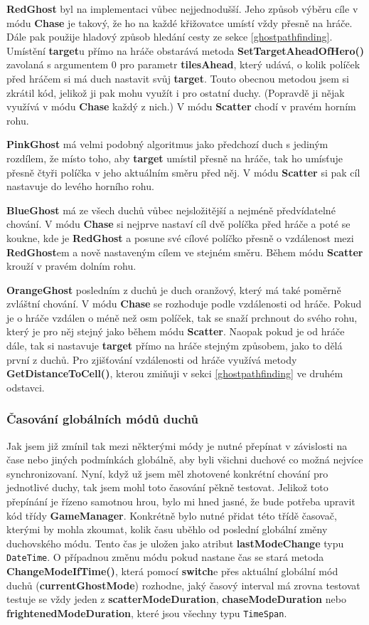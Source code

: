 \documentclass[a4]{article}
\begin{document}
\textbf{RedGhost} byl na implementaci vůbec nejjednodušší. Jeho způsob výběru cíle v módu \textbf{Chase} je takový, že ho na každé křižovatce umístí vždy přesně na hráče. Dále pak použije hladový způsob hledání cesty ze sekce \ref{ghostpathfinding}. Umístění \textbf{target}u přímo na hráče obstarává metoda \textbf{SetTargetAheadOfHero()} zavolaná s argumentem 0 pro parametr \textbf{tilesAhead}, který udává, o kolik políček před hráčem si má duch nastavit svůj \textbf{target}. Touto obecnou metodou jsem si zkrátil kód, jelikož ji pak mohu využít i pro ostatní duchy. (Popravdě ji nějak využívá v módu \textbf{Chase} každý z nich.) V módu \textbf{Scatter} chodí v pravém horním rohu.

\textbf{PinkGhost} má velmi podobný algoritmus jako předchozí duch s jediným rozdílem, že místo toho, aby \textbf{target} umístil přesně na hráče, tak ho umísťuje přesně čtyři políčka v jeho aktuálním směru před něj. V módu \textbf{Scatter} si pak cíl nastavuje do levého horního rohu.

\textbf{BlueGhost} má ze všech duchů vůbec nejsložitější a nejméně předvídatelné chování. V módu \textbf{Chase} si nejprve nastaví cíl dvě políčka před hráče a poté se koukne, kde je \textbf{RedGhost} a posune své cílové políčko přesně o vzdálenost mezi \textbf{RedGhost}em a nově nastaveným cílem ve stejném směru. Během módu \textbf{Scatter} krouží v pravém dolním rohu.

\textbf{OrangeGhost} posledním z duchů je duch oranžový, který má také poměrně zvláštní chování. V módu \textbf{Chase} se rozhoduje podle vzdálenosti od hráče. Pokud je o hráče vzdálen o méně než osm políček, tak se snaží prchnout do svého rohu, který je pro něj stejný jako během módu \textbf{Scatter}. Naopak pokud je od hráče dále, tak si nastavuje \textbf{target} přímo na hráče stejným způsobem, jako to dělá první z duchů. Pro zjišťování vzdálenosti od hráče využívá metody \textbf{GetDistanceToCell()}, kterou zmiňuji v sekci \ref{ghostpathfinding} ve druhém odstavci.

\subsubsection{Časování globálních módů duchů} \label{globalmodetiming}
Jak jsem již zmínil tak mezi některými módy je nutné přepínat v závislosti na čase nebo jiných podmínkách globálně, aby byli všichni duchové co možná nejvíce synchronizovaní. Nyní, když už jsem měl zhotovené konkrétní chování pro jednotlivé duchy, tak jsem mohl toto časování pěkně testovat. Jelikož toto přepínání je řízeno samotnou hrou, bylo mi hned jasné, že bude potřeba upravit kód třídy \textbf{GameManager}. Konkrétně bylo nutné přidat této třídě časovač, kterými by mohla zkoumat, kolik času uběhlo od poslední globální změny duchovského módu. Tento čas je uložen jako atribut \textbf{lastModeChange} typu \verb|DateTime|. O případnou změnu módu pokud nastane čas se stará metoda \textbf{ChangeModeIfTime()}, která pomocí \textbf{switch}e přes aktuální globální mód duchů (\textbf{currentGhostMode}) rozhodne, jaký časový interval má zrovna testovat testuje se vždy jeden z \textbf{scatterModeDuration}, \textbf{chaseModeDuration} nebo \textbf{frightenedModeDuration}, které jsou všechny typu \verb|TimeSpan|. 
\end{document}
